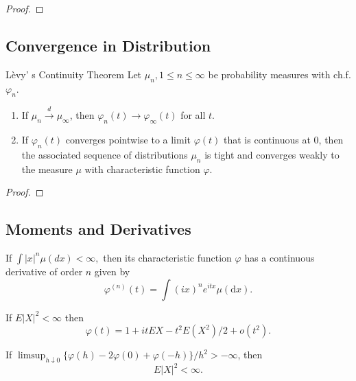 \begin{proof}
    
\end{proof}

\subsection{Convergence in Distribution}

\begin{theorem}{L\`evy' s Continuity Theorem}{}
    Let $\mu_{n},1\leq n\leq\infty$ be probability measures with ch.f. $\varphi_{n}$.
    \begin{enumerate}
        \item If $\mu_{n}\stackrel{d}{\rightarrow}\mu_{\infty}$, then $\varphi_{n}(t)\rightarrow\varphi_{\infty}(t)$ for all $t$.
        \item If $\varphi_{n}(t)$ converges pointwise to a limit $\varphi(t)$ that is continuous at $0$, then the associated sequence of distributions $\mu_{n}$ is tight and converges weakly to the measure $\mu$ with characteristic function $\varphi$.
    \end{enumerate}
\end{theorem}

\begin{proof}
    
\end{proof}

\subsection{Moments and Derivatives}

\begin{theorem}{}{}
    If $\int|x|^{n}\mu(d x)<\infty,$ then its characteristic function $\varphi$ has a continuous derivative of order $n$ given by
    \begin{equation}
        \varphi^{(n)}(t)=\int(i x)^{n}e^{itx}\mu(\mathrm{d}x).
    \end{equation}
\end{theorem}

\begin{theorem}{}{}
    If $E|X|^{2}<\infty$ then
    \begin{equation}
        \varphi(t)=1+itEX-t^{2}E\left(X^{2}\right)/2+o\left(t^{2}\right).
    \end{equation}
\end{theorem}

\begin{theorem}{}{}
    If $\limsup_{h\downarrow 0}\{\varphi(h)-2\varphi(0)+\varphi(-h)\}/h^{2}>-\infty$, then
    \begin{equation}
        E|X|^{2}<\infty.
    \end{equation}
\end{theorem}